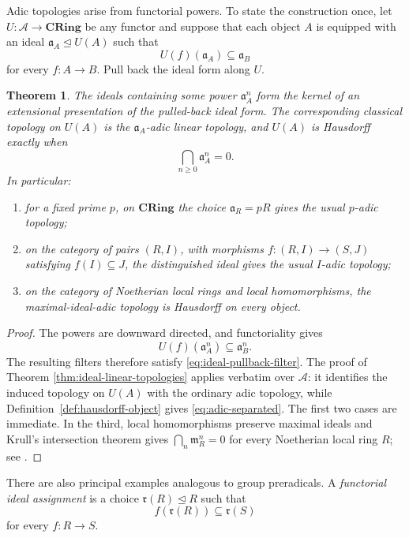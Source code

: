 \documentclass[12pt,oneside,reqno]{amsart}
\newtheorem{theorem}{Theorem}[section]
\theoremstyle{definition}
\theoremstyle{remark}
\newcommand{\CRing}{\mathbf{CRing}}
\begin{document}
Adic topologies arise from functorial powers.  To state the construction
once, let \(U:\mathcal A\to\CRing\) be any functor and suppose that each
object \(A\) is equipped with an ideal
\(\mathfrak a_A\trianglelefteq U(A)\) such that
\[
             U(f)(\mathfrak a_A)\subseteq\mathfrak a_B
\]
for every \(f:A\to B\).  Pull back the ideal form along \(U\).

\begin{theorem}\label{thm:adic-form-topology}
The ideals containing some power \(\mathfrak a_A^n\) form the kernel of
an extensional presentation of the pulled-back ideal form.  The
corresponding classical
topology on \(U(A)\) is the \(\mathfrak a_A\)-adic linear topology, and
\(U(A)\) is Hausdorff exactly when
\begin{equation}\label{eq:adic-separated}
                       \bigcap_{n\geqslant0}\mathfrak a_A^n=0.
\end{equation}
In particular:
\begin{enumerate}[label=\textup{(\roman*)}]
\item for a fixed prime \(p\), on \(\CRing\) the choice
\(\mathfrak a_R=pR\) gives the usual
\(p\)-adic topology;
\item on the category of pairs \((R,I)\), with morphisms
\(f:(R,I)\to(S,J)\) satisfying \(f(I)\subseteq J\), the distinguished
ideal gives the usual \(I\)-adic topology;
\item on the category of Noetherian local rings and local
homomorphisms, the maximal-ideal-adic topology is Hausdorff on every
object.
\end{enumerate}
\end{theorem}

\begin{proof}
The powers are downward directed, and functoriality gives
\[
 U(f)(\mathfrak a_A^n)\subseteq\mathfrak a_B^n.
\]
The resulting filters therefore satisfy
\eqref{eq:ideal-pullback-filter}.  The proof of Theorem
\ref{thm:ideal-linear-topologies} applies verbatim over \(\mathcal A\):
it identifies the induced topology on \(U(A)\) with the ordinary adic
topology, while Definition~\ref{def:hausdorff-object} gives
\eqref{eq:adic-separated}.  The first two cases are immediate.
In the third, local homomorphisms preserve maximal ideals and Krull's
intersection theorem gives
\(\bigcap_n\mathfrak m_R^n=0\) for every Noetherian local ring \(R\);
see \cite[Tag~00IP]{StacksProject}.
\end{proof}

There are also principal examples analogous to group preradicals.  A
\emph{functorial ideal assignment} is a choice
\(\mathfrak r(R)\trianglelefteq R\) such that
\[
                         f(\mathfrak r(R))
                              \subseteq\mathfrak r(S)
\]
for every \(f:R\to S\).
\end{document}
